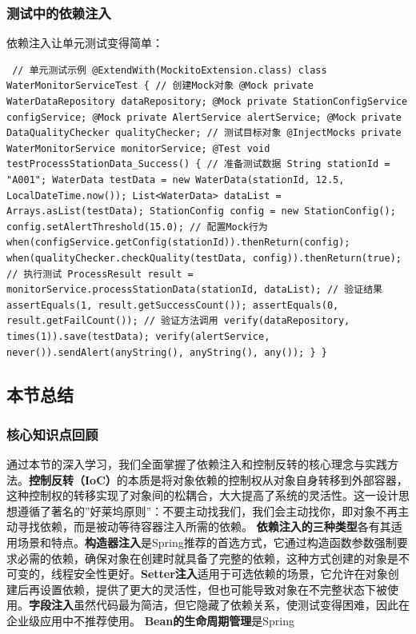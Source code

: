 \subsubsection{测试中的依赖注入}\label{ux6d4bux8bd5ux4e2dux7684ux4f9dux8d56ux6ce8ux5165} 依赖注入让单元测试变得简单： \begin{verbatim} // 单元测试示例 @ExtendWith(MockitoExtension.class) class WaterMonitorServiceTest { // 创建Mock对象 @Mock private WaterDataRepository dataRepository; @Mock private StationConfigService configService; @Mock private AlertService alertService; @Mock private DataQualityChecker qualityChecker; // 测试目标对象 @InjectMocks private WaterMonitorService monitorService; @Test void testProcessStationData_Success() { // 准备测试数据 String stationId = "A001"; WaterData testData = new WaterData(stationId, 12.5, LocalDateTime.now()); List<WaterData> dataList = Arrays.asList(testData); StationConfig config = new StationConfig(); config.setAlertThreshold(15.0); // 配置Mock行为 when(configService.getConfig(stationId)).thenReturn(config); when(qualityChecker.checkQuality(testData, config)).thenReturn(true); // 执行测试 ProcessResult result = monitorService.processStationData(stationId, dataList); // 验证结果 assertEquals(1, result.getSuccessCount()); assertEquals(0, result.getFailCount()); // 验证方法调用 verify(dataRepository, times(1)).save(testData); verify(alertService, never()).sendAlert(anyString(), anyString(), any()); } } \end{verbatim} \subsection{本节总结}\label{ux672cux8282ux603bux7ed3} \subsubsection{核心知识点回顾}\label{ux6838ux5fc3ux77e5ux8bc6ux70b9ux56deux987e} 通过本节的深入学习，我们全面掌握了依赖注入和控制反转的核心理念与实践方法。\textbf{控制反转（IoC）}的本质是将对象依赖的控制权从对象自身转移到外部容器，这种控制权的转移实现了对象间的松耦合，大大提高了系统的灵活性。这一设计思想遵循了著名的''好莱坞原则''：不要主动找我们，我们会主动找你，即对象不再主动寻找依赖，而是被动等待容器注入所需的依赖。 \textbf{依赖注入的三种类型}各有其适用场景和特点。\textbf{构造器注入}是Spring推荐的首选方式，它通过构造函数参数强制要求必需的依赖，确保对象在创建时就具备了完整的依赖，这种方式创建的对象是不可变的，线程安全性更好。\textbf{Setter注入}适用于可选依赖的场景，它允许在对象创建后再设置依赖，提供了更大的灵活性，但也可能导致对象在不完整状态下被使用。\textbf{字段注入}虽然代码最为简洁，但它隐藏了依赖关系，使测试变得困难，因此在企业级应用中不推荐使用。 \textbf{Bean的生命周期管理}是Spring 